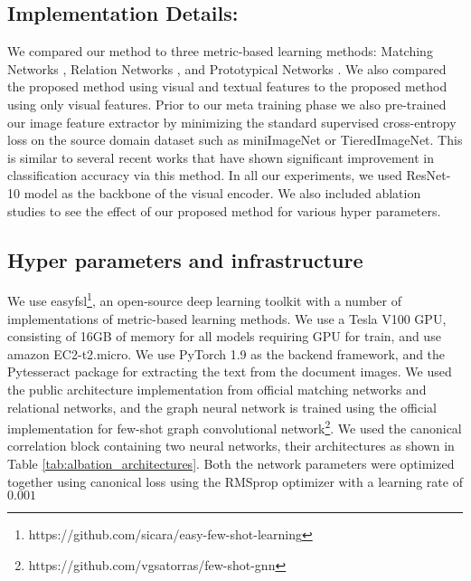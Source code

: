 \subsection{Implementation Details:} We compared our method to three metric-based learning methods: Matching Networks \citep{vinyals2016matching}, Relation Networks \citep{sung2018learning}, and Prototypical Networks \citep{snell2017prototypical}. We also compared the proposed method using visual and textual features to the proposed method using only visual features. Prior to our meta training phase we also pre-trained our image feature extractor by minimizing the standard supervised cross-entropy loss on the source domain dataset such as miniImageNet or TieredImageNet. This is similar to several recent works \citep{rusu2018meta,gidaris2018dynamic,lifchitz2019dense} that have shown significant improvement in classification accuracy via this method. In all our experiments, we used ResNet-10 model as the backbone of the visual encoder. We also included ablation studies to see the effect of our proposed method for various hyper parameters. 

\subsection{Hyper parameters and infrastructure}
We use easyfsl\footnote{https://github.com/sicara/easy-few-shot-learning},
an open-source deep learning toolkit with a number of implementations of metric-based learning methods. We use a Tesla V100 GPU, consisting of 16GB of memory for all models requiring GPU for train, and use amazon EC2-t2.micro. We use PyTorch 1.9 as the backend framework, and the Pytesseract package for extracting the text from the document images. We used the public architecture implementation from official matching networks  \citep{chen2019closer} and relational networks, and the graph neural network is trained using the official
implementation for few-shot graph convolutional network\footnote{https://github.com/vgsatorras/few-shot-gnn}. We used the canonical correlation block containing two neural networks, their architectures as shown in Table \ref{tab:albation_architectures}. Both the network parameters were optimized together using canonical loss using the RMSprop optimizer with a learning rate of $0.001$\\

